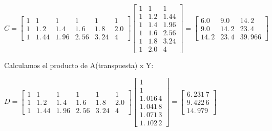 \documentclass{article}
\begin{document}
$C=\left[ 
\begin{array}{cccccc}
1 & 1 & 1 & 1 & 1 & 1 \\ 
1 & 1.\,\allowbreak 2 & 1.\,\allowbreak 4 & 1.\,\allowbreak 6 & 
1.\,\allowbreak 8 & 2.0 \\ 
1 & 1.\,\allowbreak 44 & 1.\,\allowbreak 96 & 2.\,\allowbreak 56 & 
3.\,\allowbreak 24 & 4%
\end{array}%
\right] \left[ 
\begin{array}{ccc}
1 & 1 & 1 \\ 
1 & 1.2 & 1.44 \\ 
1 & 1.4 & 1.96 \\ 
1 & 1.6 & 2.56 \\ 
1 & 1.8 & 3.24 \\ 
1 & 2.0 & 4%
\end{array}%
\right] =\allowbreak \left[ 
\begin{array}{ccc}
6.0 & 9.0 & 14.\,\allowbreak 2 \\ 
9.0 & 14.\,\allowbreak 2 & 23.\,\allowbreak 4 \\ 
14.\,\allowbreak 2 & 23.\,\allowbreak 4 & 39.\,\allowbreak 966%
\end{array}%
\right] \allowbreak $

\bigskip 

Calculamos el producto de A(transpuesta) x Y:

$D=\left[ 
\begin{array}{cccccc}
1 & 1 & 1 & 1 & 1 & 1 \\ 
1 & 1.\,\allowbreak 2 & 1.\,\allowbreak 4 & 1.\,\allowbreak 6 & 
1.\,\allowbreak 8 & 2.0 \\ 
1 & 1.\,\allowbreak 44 & 1.\,\allowbreak 96 & 2.\,\allowbreak 56 & 
3.\,\allowbreak 24 & 4%
\end{array}%
\right] \left[ 
\begin{array}{c}
1 \\ 
1 \\ 
1.\,\allowbreak 016\,4 \\ 
1.\,\allowbreak 041\,8 \\ 
1.\,\allowbreak 071\,3 \\ 
1.\,\allowbreak 102\,2%
\end{array}%
\right] =\allowbreak \left[ 
\begin{array}{c}
6.\,\allowbreak 231\,7 \\ 
9.\,\allowbreak 422\,6 \\ 
14.\,\allowbreak 979%
\end{array}%
\right] $
\end{document}
